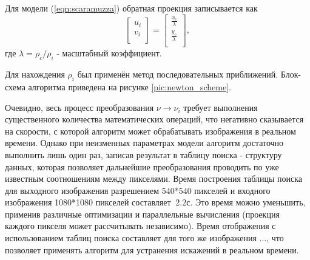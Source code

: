 
Для модели (\ref{eqn:scaramuzza}) обратная проекция записывается как 
\begin{equation}
    \label{eq:back_scara}
    \left[\begin{matrix}u_i\\v_i\\\end{matrix}\right] = \left[\begin{matrix} \frac{x_c}{\lambda}  \\  \frac{y_c}{\lambda} \\\end{matrix}\right],
\end{equation}  
где $\lambda = \rho_c / \rho_i$ - масштабный коэффициент. 

Для нахождения $\rho_i$ был применён метод последовательных приближений. Блок-схема алгоритма приведена на рисунке \ref{pic:newton_scheme}.


Очевидно, весь процесс преобразования $\nu \rightarrow \nu_i$ требует выполнения существенного количества математических операций, что 
негативно сказывается на скорости, с которой алгоритм может обрабатывать изображения в реальном времени. Однако при неизменных параметрах 
модели алгоритм достаточно выполнить лишь один раз, записав результат в таблицу поиска - структуру данных, которая позволяет дальнейшие 
преобразования проводить по уже известным соотношениям между пикселями. Время построения таблицы поиска для выходного изображения 
разрешением 540*540 пикселей и входного изображения 1080*1080 пикселей составляет $~2.2с$. %
Это время можно уменьшить, применив различные оптимизации и параллельные вычисления (проекция каждого пикселя может рассчитывать независимо). %
Время отображения с использованием таблиц поиска составляет для того же изображения $ ... $, что позволяет применять алгоритм для устранения 
искажений в реальном времени.